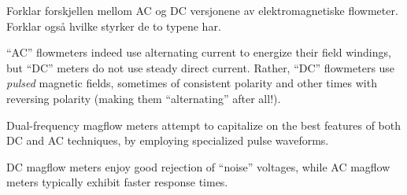 

Forklar forskjellen mellom AC og DC versjonene av elektromagnetiske flowmeter. Forklar også hvilke styrker de to typene har.







``AC'' flowmeters indeed use alternating current to energize their field windings, but ``DC'' meters do not use steady direct current.  Rather, ``DC'' flowmeters use {\it pulsed} magnetic fields, sometimes of consistent polarity and other times with reversing polarity (making them ``alternating'' after all!).

Dual-frequency magflow meters attempt to capitalize on the best features of both DC and AC techniques, by employing specialized pulse waveforms.

\vskip 10pt

DC magflow meters enjoy good rejection of ``noise'' voltages, while AC magflow meters typically exhibit faster response times.










